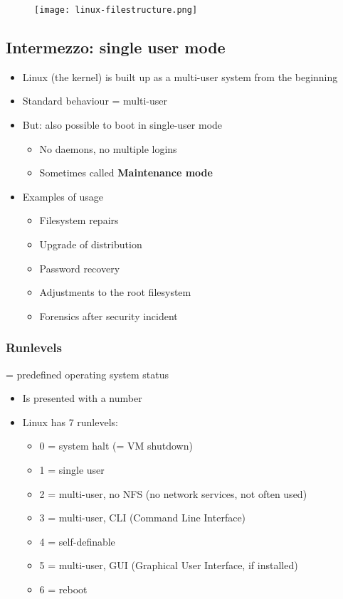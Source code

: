 \documentclass{article}
\begin{document}
\begin{figure}[H]
    \centering
    \texttt{[image: linux-filestructure.png]}
    \caption{}
\end{figure}



\subsection{Intermezzo: single user mode}

\begin{itemize}
    \item Linux (the kernel) is built up as a multi-user system from the beginning
    \item Standard behaviour = multi-user
    \item But: also possible to boot in single-user mode
    \begin{itemize}
        \item No daemons, no multiple logins
        \item Sometimes called \textbf{Maintenance mode}
    \end{itemize}
    \item Examples of usage
    \begin{itemize}
        \item Filesystem repairs
        \item Upgrade of distribution
        \item Password recovery
        \item Adjustments to the root filesystem
        \item Forensics after security incident
    \end{itemize}
\end{itemize}

\subsubsection{Runlevels}

= predefined operating system status

\begin{itemize}
    \item Is presented with a number
    \item Linux has 7 runlevels:
    \begin{itemize}
        \item 0 = system halt (= VM shutdown)
        \item 1 = single user
        \item 2 = multi-user, no NFS (no network services, not often used)
        \item 3 = multi-user, CLI (Command Line Interface)
        \item 4 = self-definable
        \item 5 = multi-user, GUI (Graphical User Interface, if installed)
        \item 6 = reboot
    \end{itemize}
\end{itemize}
\end{document}
